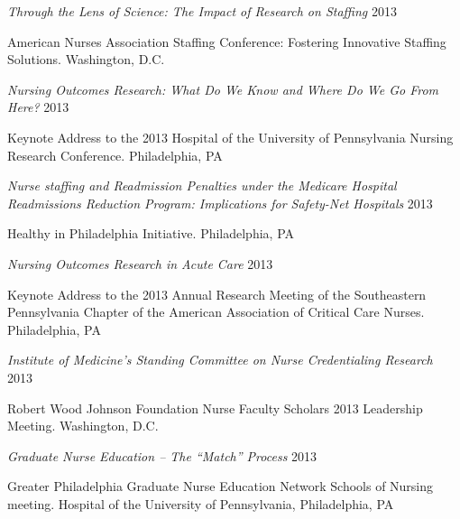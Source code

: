 \documentclass[10pt,]{article}
\begin{document}
{{{{{{{{{{{{{{{\begin{hangparas}{.5in}{1}
{\textit {Through the Lens of Science: The Impact of Research on Staffing}} \hfill 2013 
\vspace{-2.5mm}
\begin{adjustwidth}{0.5cm}{1cm}
American Nurses Association Staffing Conference: Fostering Innovative Staffing Solutions. Washington, D.C.
\end{adjustwidth}

{\textit {Nursing Outcomes Research: What Do We Know and Where Do We Go From Here?}} \hfill 2013 
\vspace{-2.5mm}
\begin{adjustwidth}{0.5cm}{1cm}
Keynote Address to the 2013 Hospital of the University of Pennsylvania Nursing Research Conference. Philadelphia, PA
\end{adjustwidth}

{\textit {Nurse staffing and Readmission Penalties under the Medicare Hospital Readmissions Reduction Program: Implications for Safety-Net Hospitals}} \hfill 2013 
\vspace{-2.5mm}
\begin{adjustwidth}{0.5cm}{1cm}
Healthy in Philadelphia Initiative. Philadelphia, PA
\end{adjustwidth}

{\textit {Nursing Outcomes Research in Acute Care}} \hfill 2013 
\vspace{-2.5mm}
\begin{adjustwidth}{0.5cm}{1cm}
Keynote Address to the 2013 Annual Research Meeting of the Southeastern Pennsylvania Chapter of the American Association of Critical Care Nurses. Philadelphia, PA
\end{adjustwidth}

{\textit {Institute of Medicine’s Standing Committee on Nurse Credentialing Research}} \hfill 2013 
\vspace{-2.5mm}
\begin{adjustwidth}{0.5cm}{1cm}
Robert Wood Johnson Foundation Nurse Faculty Scholars 2013 Leadership Meeting. Washington, D.C.
\end{adjustwidth}

{\textit {Graduate Nurse Education – The “Match” Process}} \hfill 2013 
\vspace{-2.5mm}
\begin{adjustwidth}{0.5cm}{1cm}
Greater Philadelphia Graduate Nurse Education Network Schools of Nursing meeting. Hospital of the University of Pennsylvania, Philadelphia, PA
\end{adjustwidth}


\end{hangparas}}}}}}}}}}}}}}}}
\end{document}
